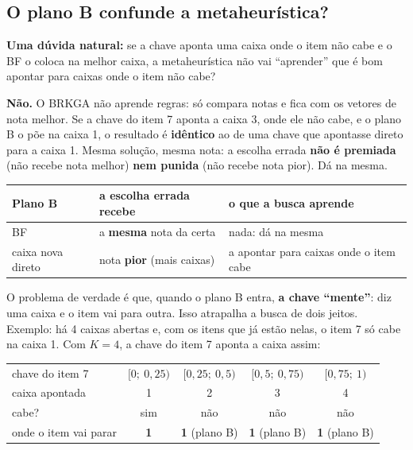 \documentclass[11pt,a4paper]{article}
\begin{document}
\subsection{O plano B confunde a metaheurística?}\label{sec:confunde}
\textbf{Uma dúvida natural:} se a chave aponta uma caixa onde o item não cabe e o BF o coloca na melhor caixa, a
metaheurística não vai ``aprender'' que é bom apontar para caixas onde o item não cabe?

\textbf{Não.} O BRKGA não aprende regras: só compara notas e fica com os vetores de nota melhor. Se a chave do item 7
aponta a caixa 3, onde ele não cabe, e o plano B o põe na caixa 1, o resultado é \textbf{idêntico} ao de uma chave que
apontasse direto para a caixa 1. Mesma solução, mesma nota: a escolha errada \textbf{não é premiada} (não recebe nota
melhor) \textbf{nem punida} (não recebe nota pior). Dá na mesma.

\begin{center}\small
\begin{tabular}{@{}lll@{}}
\toprule
Plano B & a escolha errada recebe & o que a busca aprende \\ \midrule
BF & a \textbf{mesma} nota da certa & nada: dá na mesma \\
caixa nova direto & nota \textbf{pior} (mais caixas) & a apontar para caixas onde o item cabe \\
\bottomrule
\end{tabular}
\end{center}

O problema de verdade é que, quando o plano B entra, \textbf{a chave ``mente''}: diz uma caixa e o item vai para outra.
Isso atrapalha a busca de dois jeitos. Exemplo: há 4 caixas abertas e, com os itens que já estão nelas, o item 7 só cabe na caixa 1. Com $K=4$, a chave
do item 7 aponta a caixa assim:

\begin{center}\small
\begin{tabular}{@{}lcccc@{}}
\toprule
chave do item 7 & $[0;\ 0{,}25)$ & $[0{,}25;\ 0{,}5)$ & $[0{,}5;\ 0{,}75)$ & $[0{,}75;\ 1)$ \\
caixa apontada & 1 & 2 & 3 & 4 \\
cabe? & sim & não & não & não \\
onde o item vai parar & \textbf{1} & \textbf{1} (plano B) & \textbf{1} (plano B) & \textbf{1} (plano B) \\
\bottomrule
\end{tabular}
\end{center}
\end{document}
